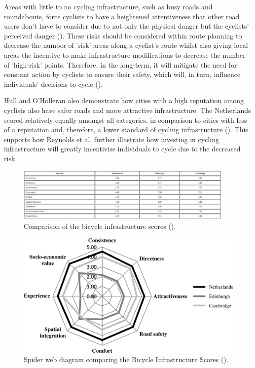 Areas with little to no cycling infrastructure, such as busy roads and roundabouts, force cyclists to have a heightened attentiveness that other road users don't have to consider due to not only the physical danger but the cyclists' perceived danger (\cite{doorley_analysis_2015}). These risks should be considered within route planning to decrease the number of 'risk' areas along a cyclist's route whilst also giving local areas the incentive to make infrastructure modifications to decrease the number of 'high-risk' points. Therefore, in the long-term, it will mitigate the need for constant action by cyclists to ensure their safety, which will, in turn, influence individuals' decisions to cycle (\cite{reynolds_impact_2009}).

Hull and O'Holleran also demonstrate how cities with a high reputation among cyclists also have safer roads and more attractive infrastructure. The Netherlands scored relatively equally amongst all categories, in comparison to cities with less of a reputation and, therefore, a lower standard of cycling infrastructure   (\cite{hull_bicycle_2014}). This supports how Reynolds et al. further illustrate how investing in cycling infrastructure will greatly incentivise individuals to cycle due to the decreased risk. 

\begin{figure}
    \centering
    \includegraphics[width=400px, keepaspectratio]{figures/bicycle_infrastructure_score_table.jpg}
    \caption{Comparison of the bicycle infrastructure scores (\cite{hull_bicycle_2014}).}
    \label{fig:bicycleinfrastructurescorestable}
\end{figure}

\begin{figure}
    \centering
    \includegraphics{figures/bicycle_infrastructure_scores.jpg}
    \caption{Spider web diagram comparing the Bicycle Infrastructure Scores (\cite{hull_bicycle_2014}).}
    \label{fig:bicycleinfrastructurescores}
\end{figure}

